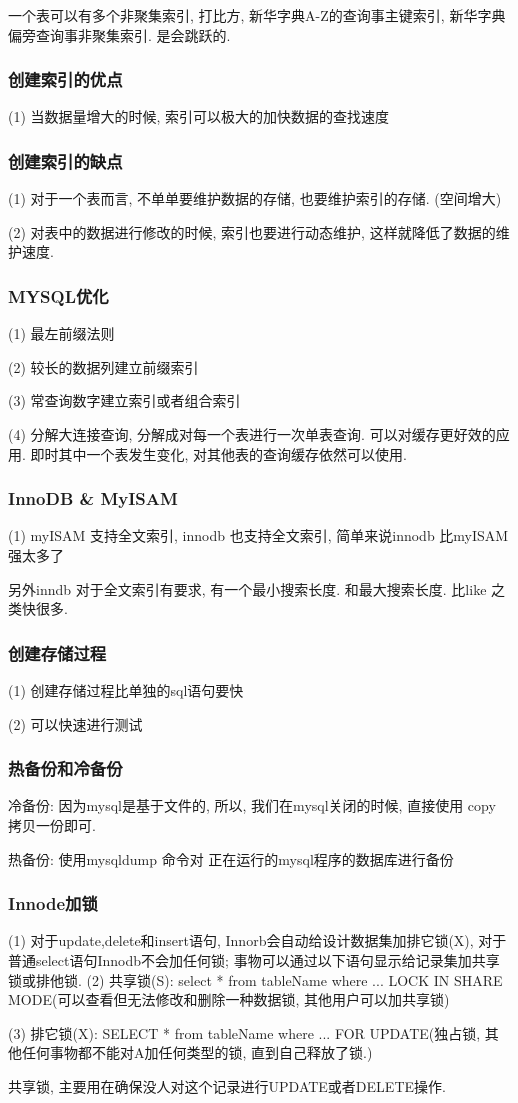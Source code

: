 \documentclass[UTF8]{ctexart}
\begin{document}
一个表可以有多个非聚集索引, 打比方, 新华字典A-Z的查询事主键索引, 新华字典偏旁查询事非聚集索引. 是会跳跃的.


\subsubsection{创建索引的优点}
(1) 当数据量增大的时候, 索引可以极大的加快数据的查找速度
\subsubsection{创建索引的缺点}
(1) 对于一个表而言, 不单单要维护数据的存储, 也要维护索引的存储. (空间增大)
\par
(2) 对表中的数据进行修改的时候, 索引也要进行动态维护, 这样就降低了数据的维护速度.
\subsubsection{MYSQL优化}
(1) 最左前缀法则 \par
(2) 较长的数据列建立前缀索引 \par
(3) 常查询数字建立索引或者组合索引 \par
(4) 分解大连接查询, 分解成对每一个表进行一次单表查询. 可以对缓存更好效的应用. 即时其中一个表发生变化, 对其他表的查询缓存依然可以使用.
\subsubsection{InnoDB \& MyISAM}
(1) myISAM 支持全文索引, innodb 也支持全文索引, 简单来说innodb 比myISAM强太多了\par
另外inndb 对于全文索引有要求, 有一个最小搜索长度. 和最大搜索长度. 比like 之类快很多.
\subsubsection{创建存储过程}
(1) 创建存储过程比单独的sql语句要快\par
(2) 可以快速进行测试
\subsubsection{热备份和冷备份}
冷备份: 因为mysql是基于文件的, 所以, 我们在mysql关闭的时候, 直接使用 copy 拷贝一份即可. \par
热备份: 使用mysqldump 命令对 正在运行的mysql程序的数据库进行备份
\subsubsection{Innode加锁}
(1) 对于update,delete和insert语句, Innorb会自动给设计数据集加排它锁(X), 对于普通select语句Innodb不会加任何锁; 事物可以通过以下语句显示给记录集加共享锁或排他锁.
(2) 共享锁(S): select * from tableName where ... LOCK IN SHARE MODE(可以查看但无法修改和删除一种数据锁, 其他用户可以加共享锁) \par
(3) 排它锁(X): SELECT * from tableName where ... FOR UPDATE(独占锁, 其他任何事物都不能对A加任何类型的锁, 直到自己释放了锁.) \par
共享锁, 主要用在确保没人对这个记录进行UPDATE或者DELETE操作.
\end{document}
